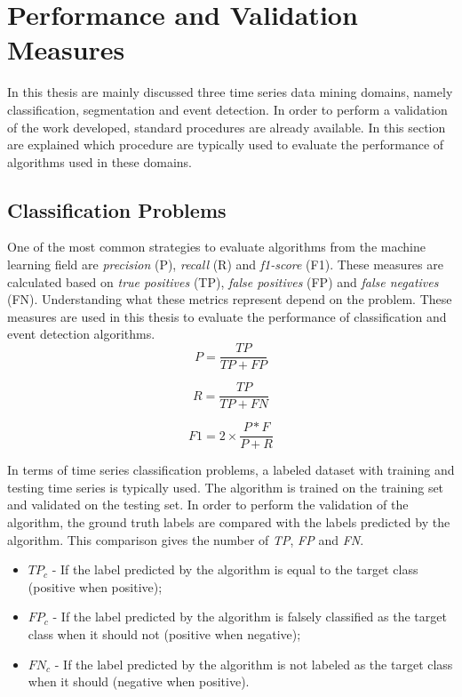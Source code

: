 \section{Performance and Validation Measures}

In this thesis are mainly discussed three time series data mining domains, namely classification, segmentation and event detection. In order to perform a validation of the work developed, standard procedures are already available. In this section are explained which procedure are typically used to evaluate the performance of algorithms used in these domains.

\subsection{Classification Problems}

One of the most common strategies to evaluate algorithms from the machine learning field are \textit{precision} (P), \textit{recall} (R) and \textit{f1-score} (F1). These measures are calculated based on \textit{true positives} (TP), \textit{false positives} (FP) and \textit{false negatives} (FN). Understanding what these metrics represent depend on the problem. These measures are used in this thesis to evaluate the performance of classification and event detection algorithms.
\begin{equation}
\label{eq:precision}
P = \frac{TP}{TP+FP}
\end{equation}

\begin{equation}
\label{eq:recall}
R = \frac{TP}{TP+FN}
\end{equation}

\begin{equation}
\label{eq:f1_score}
F1 = 2 \times \frac{P*F}{P+R}
\end{equation}

In terms of time series classification problems, a labeled dataset with training and testing time series is typically used. The algorithm is trained on the training set and validated on the testing set. In order to perform the validation of the algorithm, the ground truth labels are compared with the labels predicted by the algorithm. This comparison gives the number of \textit{TP}, \textit{FP} and \textit{FN}. 

\begin{itemize}
    \item $TP_c$ - If the label predicted by the algorithm is equal to the target class (positive when positive);
    
    \item $FP_c$ - If the label predicted by the algorithm is falsely classified as the target class when it should not (positive when negative);
    
    \item $FN_c$ - If the label predicted by the algorithm is not labeled as the target class when it should (negative when positive).
    
\end{itemize}

